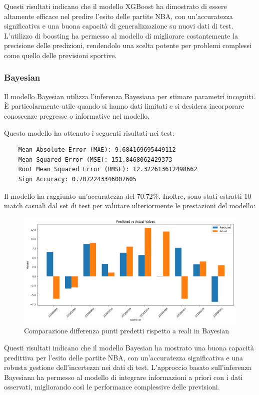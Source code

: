 \documentclass[a4paper]{article}
\numberwithin{equation}{section}
\begin{document}
Questi risultati indicano che il modello XGBoost ha dimostrato di essere altamente efficace nel predire l'esito delle partite NBA, con un'accuratezza significativa e una buona capacità di generalizzazione su nuovi dati di test. L'utilizzo di boosting ha permesso al modello di migliorare costantemente la precisione delle predizioni, rendendolo una scelta potente per problemi complessi come quello delle previsioni sportive.


\subsubsection{Bayesian}

Il modello Bayesian utilizza l'inferenza Bayesiana per stimare parametri incogniti. È particolarmente utile quando si hanno dati limitati e si desidera incorporare conoscenze pregresse o informative nel modello.

Questo modello ha ottenuto i seguenti risultati nei test:

\begin{lstlisting}
    Mean Absolute Error (MAE): 9.684169695449112
    Mean Squared Error (MSE): 151.8468062429373
    Root Mean Squared Error (RMSE): 12.322613612498662
    Sign Accuracy: 0.7072243346007605
\end{lstlisting}

Il modello ha raggiunto un'accuratezza del 70.72\%. Inoltre, sono stati estratti 10 match casuali dal set di test per valutare ulteriormente le prestazioni del modello:

\begin{figure}[H]
    \centering
    \includegraphics[width=0.7\linewidth]{img/bayesian_istogramma.png}
    \caption{Comparazione differenza punti predetti rispetto a reali in Bayesian}
    \label{fig:enter-label}
\end{figure}

Questi risultati indicano che il modello Bayesian ha mostrato una buona capacità predittiva per l'esito delle partite NBA, con un'accuratezza significativa e una robusta gestione dell'incertezza nei dati di test. L'approccio basato sull'inferenza Bayesiana ha permesso al modello di integrare informazioni a priori con i dati osservati, migliorando così le performance complessive delle previsioni.
\end{document}
